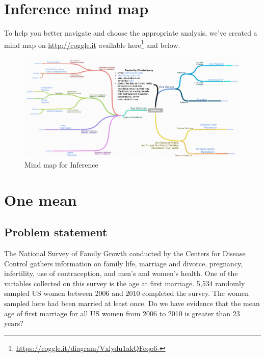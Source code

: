 \documentclass[12pt,]{krantz}
\renewcommand{\href}[2]{#2\footnote{\url{#1}}}
\theoremstyle{definition}
\theoremstyle{definition}
\theoremstyle{definition}
\theoremstyle{remark}
\begin{document}
\section{Inference mind map}\label{inference-mind-map}

To help you better navigate and choose the appropriate analysis, we've
created a mind map on \url{http://coggle.it} available
\href{https://coggle.it/diagram/Vxlydu1akQFeqo6-}{here} and below.

\begin{figure}

{\centering \includegraphics[width=2\linewidth]{images/coggle} 

}

\caption{Mind map for Inference}\label{fig:infer-map}
\end{figure}

\section{One mean}\label{one-mean}

\subsection{Problem statement}\label{problem-statement}

The National Survey of Family Growth conducted by the Centers for
Disease Control gathers information on family life, marriage and
divorce, pregnancy, infertility, use of contraception, and men's and
women's health. One of the variables collected on this survey is the age
at first marriage. 5,534 randomly sampled US women between 2006 and 2010
completed the survey. The women sampled here had been married at least
once. Do we have evidence that the mean age of first marriage for all US
women from 2006 to 2010 is greater than 23 years? \citep[Tweaked a bit
from][ {[}Chapter 4{]}]{isrs2014}
\end{document}
